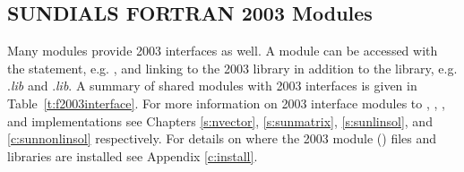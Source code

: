 \subsection{SUNDIALS FORTRAN 2003 Modules}

Many {\sundials} modules provide {\F} 2003 interfaces as well. A module can be accessed
with the  statement, e.g. , and linking to the
{\F} 2003 library in addition to the {\CC} library, e.g.
.{\em lib} and .{\em lib}.
A summary of shared {\sundials} modules with {\F} 2003 interfaces is given in 
Table~\ref{t:f2003interface}. For more information on {\F} 2003 interface modules
to {\nvector}, {\sunmatrix}, {\sunlinsol}, and {\sunnonlinsol} implementations see
Chapters \ref{s:nvector}, \ref{s:sunmatrix}, \ref{s:sunlinsol}, and \ref{c:sunnonlinsol}
respectively. For details on where the {\F} 2003 module () files and libraries
are installed see Appendix \ref{c:install}.

